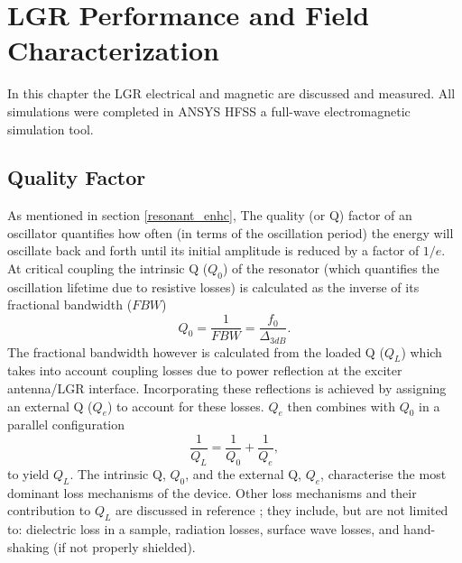 
\chapter{LGR Performance and Field Characterization} \label{ch3}

In this chapter the LGR electrical and magnetic are discussed and measured. All simulations were completed in ANSYS HFSS a full-wave electromagnetic simulation tool. 

\section{Quality Factor}\label{quality}

As mentioned in section \ref{resonant_enhc}, The quality (or Q) factor of an oscillator quantifies how often (in terms of the oscillation period) the energy will oscillate back and forth until its initial amplitude is reduced by a factor of $1/e$. At critical coupling the intrinsic Q ($Q_0$) of the resonator (which quantifies the oscillation lifetime due to resistive losses) is calculated as the inverse of its fractional bandwidth ($FBW$)
\begin{equation}
Q_0 = \frac{1}{FBW} = \frac{f_0}{\Delta_{3dB}}.
\end{equation} 
The fractional bandwidth however is calculated from the loaded Q ($Q_L$) which takes into account coupling losses due to power reflection at the exciter antenna/LGR interface. Incorporating these reflections is achieved by assigning an external Q ($Q_e$) to account for these losses. $Q_e$ then combines with $Q_0$ in a parallel configuration
\begin{equation}
\frac{1}{Q_L} = \frac{1}{Q_0} + \frac{1}{Q_e},
\end{equation} 
to yield $Q_L$. The intrinsic Q, $Q_0$, and the external Q, $Q_e$, characterise the most dominant loss mechanisms of the device. Other loss mechanisms and their contribution to $Q_L$ are discussed in reference \cite{piasecki1993field}; they include, but are not limited to: dielectric loss in a sample, radiation losses, surface wave losses, and hand-shaking (if not properly shielded).

